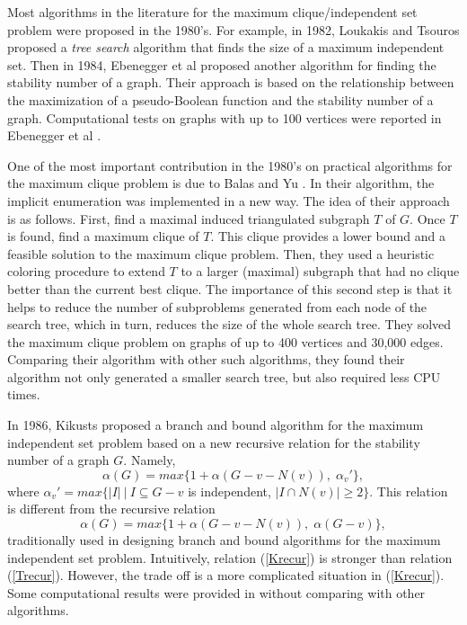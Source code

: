 Most algorithms in the literature for the maximum clique/independent
set problem were proposed in the 1980's. For example, in 1982,
Loukakis and Tsouros \cite{LoTs82} proposed a {\em tree search}
algorithm that finds the size of a maximum independent set. Then in
1984, Ebenegger et al \cite{EbHaWe84} proposed another algorithm for
finding the stability number of a graph. Their approach is based on
the relationship between the maximization of a pseudo-Boolean
function and the stability number of a graph. Computational tests on
graphs with up to 100 vertices were reported in Ebenegger et al
\cite{EbHaWe84}.

One of the most important contribution in the 1980's on practical
algorithms for the maximum clique problem is due to Balas and Yu
\cite{BaYu86}. In their algorithm, the implicit enumeration was
implemented in a new way. The idea of their approach is as follows.
First, find a maximal induced triangulated subgraph $T$ of $G$. Once
$T$ is found, find a maximum clique of $T$. This clique provides a
lower bound and a feasible solution to the maximum clique problem.
Then, they used a heuristic coloring procedure to extend $T$ to a
larger (maximal) subgraph that had no clique better than the current
best clique. The importance of this second step is that it helps to
reduce the number of subproblems generated from each node of the
search tree, which in turn, reduces the size of the whole search
tree. They solved the maximum clique problem on graphs of up to 400
vertices and 30,000 edges. Comparing their algorithm with other such
algorithms, they found their algorithm not only generated a smaller
search tree, but also required less CPU times.

In 1986, Kikusts \cite{Kik86} proposed a branch and bound algorithm
for the maximum independent set problem based on a new recursive
relation for the stability number of a graph $G$. Namely,
\begin{equation}
\alpha(G) = max\{1 + \alpha(G-v-N(v)), \; \alpha_v' \},
	\label{Krecur}
\end{equation}
where $\alpha_v' = max\{|I|\ | \ I \subseteq G-v$ is independent,
$|I \cap N(v)| \geq 2\}$. This relation is different from the
recursive relation
\begin{equation}
\alpha(G) = max\{1+\alpha(G-v-N(v)), \; \alpha(G-v)\},
	\label{Trecur}
\end{equation}
traditionally used in designing branch and bound algorithms for the
maximum independent set problem. Intuitively, relation
(\ref{Krecur}) is stronger than relation (\ref{Trecur}). However,
the trade off is a more complicated situation in (\ref{Krecur}).
Some computational results were provided in \cite{Kik86} without
comparing with other algorithms.


